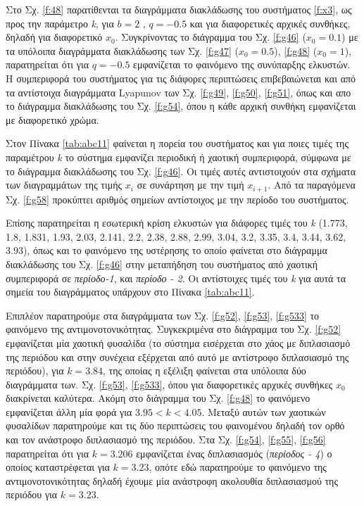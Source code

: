 Στο Σχ. \ref{f:48} παρατίθενται τα διαγράμματα διακλάδωσης του συστήματος \ref{f:x3}, ως προς την παράμετρο \emph{k}, για $b = 2$ , $q =-0.5$ και για διαφορετικές αρχικές συνθήκες, δηλαδή για διαφορετικό \(x_0\). Συγκρίνοντας το διάγραμμα του Σχ. \ref{f:g46} (\(x_0=0.1\)) με τα υπόλοιπα διαγράμματα διακλάδωσης των Σχ. \ref{f:g47} (\(x_0=0.5\)), \ref{f:g48} (\(x_0=1\)), παρατηρείται ότι για $q=-0.5$ εμφανίζεται το φαινόμενο της συνύπαρξης ελκυστών. Η συμπεριφορά του συστήματος για τις διάφορες περιπτώσεις επιβεβαιώνεται και από τα αντίστοιχα διαγράμματα Lyapunov των Σχ. \ref{f:g49}, \ref{f:g50}, \ref{f:g51}, όπως και απο το διάγραμμα διακλάδωσης του Σχ. \ref{f:g54}, όπου η κάθε αρχική συνθήκη εμφανίζεται με διαφορετικό χρώμα.

Στον Πίνακα \ref{tab:abc11} φαίνεται η πορεία του συστήματος και για ποιες τιμές της παραμέτρου \emph{k} το σύστημα εμφανίζει περιοδική ή χαοτική συμπεριφορά, σύμφωνα με το διάγραμμα διακλάδωσης του Σχ. \ref{f:g46}. Οι τιμές αυτές αντιστοιχούν στα σχήματα των διαγραμμάτων της τιμής \(x_i\) σε συνάρτηση με την τιμή \(x_{i+1}\). Από τα παραγόμενα Σχ. \ref{f:g58} προκύπτει αριθμός σημείων αντίστοιχος με την περίοδο του συστήματος.

Επίσης παρατηρείται η εσωτερική κρίση ελκυστών για διάφορες τιμές του \emph{k} (1.773, 1.8, 1.831, 1.93, 2.03, 2.141, 2.2, 2.38,
2.88, 2.99, 3.04, 3.2, 3.35, 3.4, 3.44, 3.62, 3.93), όπως και το φαινόμενο της υστέρησης το οποίο φαίνεται στο διάγραμμα διακλάδωσης του Σχ. \ref{f:g46} στην μεταπήδηση του συστήματος από χαοτική συμπεριφορά σε \emph{περίοδο-1}, και \emph{περίοδο - 2}. Οι αντίστοιχες τιμές του \emph{k} για αυτά τα σημεία του διαγράμματος υπάρχουν στο Πίνακα \ref{tab:abc11}.

Επιπλέον παρατηρούμε στα διαγράμματα των Σχ. \ref{f:g52}, \ref{f:g53}, \ref{f:g533} το φαινόμενο της αντιμονοτονικότητας. Συγκεκριμένα στο διάγραμμα του Σχ. \ref{f:g52} εμφανίζεται μία χαοτική φυσαλίδα (το σύστημα εισέρχεται στο χάος με διπλασιασμό της περιόδου και στην συνέχεια εξέρχεται από αυτό με αντίστροφο διπλασιασμό της περιόδου), για $k=3.84$, της οποίας η εξέλιξη φαίνεται στα υπόλοιπα δύο διαγράμματα των. Σχ. \ref{f:g53}, \ref{f:g533}, όπου για διαφορετικές αρχικές συνθήκες $x_0$ διακρίνεται καλύτερα. Ακόμη στο διάγραμμα του Σχ. \ref{f:g48} το φαινόμενο εμφανίζεται άλλη μία φορά για $3.95<k<4.05$.
Μεταξύ αυτών των χαοτικών φυσαλίδων παρατηρούμε και τις δύο περιπτώσεις του φαινομένου δηλαδή τον ορθό και τον ανάστροφο διπλασιασμό της περιόδου.%
Στα Σχ. \ref{f:g54}, \ref{f:g55}, \ref{f:g56} παρατηρείται ότι για $k=3.206$ εμφανίζεται ένας διπλασιασμός (\emph{περίοδος - 4}) ο οποίος καταστρέφεται για $k=3.23$, οπότε εδώ παρατηρούμε το φαινόμενο της αντιμονοτονικότητας δηλαδή έχουμε μία ανάστροφη ακολουθία διπλασιασμού της περιόδου για $k=3.23$. 

